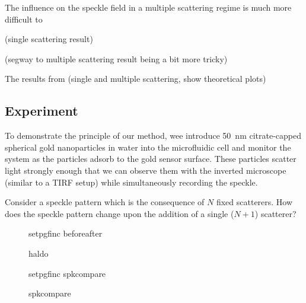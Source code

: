 The influence on the speckle field in a multiple scattering regime is much
more difficult to 

(single scattering result)

(segway to multiple scattering result being a bit more tricky)


The results from (single and multiple scattering, show theoretical plots)





\subsection{Experiment}
To demonstrate the principle of our method, wee introduce
\SI{50}{\nano\meter} citrate-capped spherical gold nanoparticles in water
into the microfluidic cell and monitor the system as the particles adsorb
to the gold sensor surface.  These particles scatter light strongly enough
that we can observe them with the inverted microscope (similar to a TIRF
setup) while simultaneously recording the speckle. 

Consider a speckle pattern which is the consequence of $N$ fixed
scatterers.  How does the speckle pattern change upon the addition of a
single ($N+1$) scatterer?  

\begin{figure}
\centering
{setpgfinc}
{beforeafter}
\caption{haldo}
\label{fig:scattbeforeafter}
\end{figure}

\begin{figure}
\centering
{setpgfinc}
{spkcompare}
\caption{spkcompare}
\label{fig:scattspkcompare}
\end{figure}

